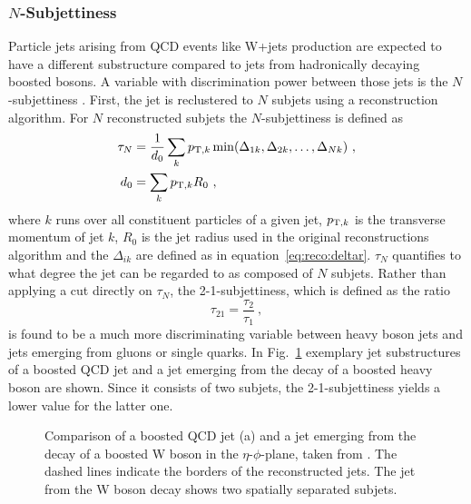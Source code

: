 \subsubsection*{$N$-Subjettiness}
Particle jets arising from QCD events like W+jets production are expected to have a different substructure compared to jets from hadronically decaying boosted bosons. A variable with discrimination power between those jets is the $N$-subjettiness \cite{nsubjettiness}. First, the jet is reclustered to $N$ subjets using a reconstruction algorithm. For $N$ reconstructed subjets the $N$-subjettiness is defined as
\begin{align}
\tau_N &= \frac{1}{d_0} \sum_k p_{{\rm T},k} \min(\Delta_{1k},\Delta_{2k},\dots,\Delta_{Nk}) ~, \\
d_0 &= \sum_k p_{{\rm T},k} R_0 ~,
\end{align}
where $k$ runs over all constituent particles of a given jet, $p_{{\rm T},k}$ is the transverse momentum of jet $k$, $R_0$ is the jet radius used in the original reconstructions algorithm and the $\Delta_{ik}$ are defined as in equation~\ref{eq:reco:deltar}. $\tau_N$ quantifies to what degree the jet can be regarded to as composed of $N$ subjets. Rather than applying a cut directly on $\tau_N$, the 2-1-subjettiness, which is defined as the ratio
\begin{equation}
\tau_{21}=\frac{\tau_2}{\tau_1} ~,
\end{equation}
is found to be a much more discriminating variable between heavy boson jets and jets emerging from gluons or single quarks. In Fig.~\ref{fig:reco:nsubjet} exemplary jet substructures of a boosted QCD jet and a jet emerging from the decay of a boosted heavy boson are shown. Since it consists of two subjets, the 2-1-subjettiness yields a lower value for the latter one.
\begin{figure}
    \centering
    \caption[Comparison of a boosted QCD jet and a jet emerging from the decay of a boosted W boson in the $y$-$\phi$-plane]{Comparison of a boosted QCD jet (a) and a jet emerging from the decay of a boosted W boson in the $\eta$-$\phi$-plane, taken from \cite{nsubjettiness}. The dashed lines indicate the borders of the reconstructed jets. The jet from the W boson decay shows two spatially separated subjets.}
    \label{fig:reco:nsubjet}
\end{figure}
